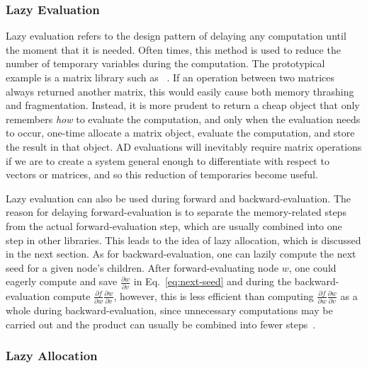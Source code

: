 \subsubsection{Lazy Evaluation}\label{sssec:lazy-eval}

Lazy evaluation refers to the design pattern of delaying any computation until the moment that it is needed.
Often times, this method is used to reduce the number of temporary variables during the computation.
The prototypical example is a matrix library such as ~\cite{eigen:2010}.
If an operation between two matrices always returned another matrix, 
this would easily cause both memory thrashing and fragmentation.
Instead, it is more prudent to return a cheap object that only remembers \emph{how} to evaluate the computation,
and only when the evaluation needs to occur, one-time allocate a matrix object, 
evaluate the computation, and store the result in that object.
AD evaluations will inevitably require matrix operations if we are to create a system
general enough to differentiate with respect to vectors or matrices,
and so this reduction of temporaries become useful.

Lazy evaluation can also be used during forward and backward-evaluation.
The reason for delaying forward-evaluation is to separate
the memory-related steps from the actual forward-evaluation step,
which are usually combined into one step in other libraries.
This leads to the idea of lazy allocation, which is discussed in the next section.
As for backward-evaluation, one can lazily compute the next seed for a given node's children.
After forward-evaluating node $w$, 
one could eagerly compute and save $\frac{\partial w}{\partial v}$
in Eq.~\ref{eq:next-seed} and during the backward-evaluation 
compute $\frac{\partial f}{\partial w} \frac{\partial w}{\partial v}$,
however, this is less efficient than 
computing $\frac{\partial f}{\partial w} \frac{\partial w}{\partial v}$ as a whole
during backward-evaluation,
since unnecessary computations may be carried out
and the product can usually be combined into fewer steps~\cite{carpenter:2015}.

\subsubsection{Lazy Allocation}\label{sssec:lazy-alloc}

